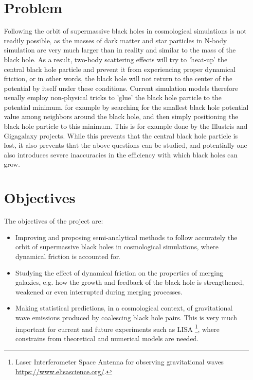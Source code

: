 \documentclass[a4,useAMS,usenatbib,usegraphicx,12pt]{article}
\begin{document}
\section{Problem}


Following the orbit of supermassive black holes in cosmological simulations is 
not readily possible, as the masses of dark matter and star particles in N-body 
simulation are very much larger than in reality and similar to the mass of the 
black hole. As a result, two-body scattering effects will try to 'heat-up' the 
central black hole particle and prevent it from experiencing proper dynamical 
friction, or in other words, the black hole will not return to the center of the 
potential by itself under these conditions. Current simulation models therefore 
usually employ non-physical tricks to 'glue' the black hole particle to the 
potential minimum, for example by searching for the smallest black hole potential 
value among neighbors around the black hole, and then simply positioning the black 
hole particle to this minimum. This is for example done by the Illustris and 
Gigagalaxy projects. While this prevents that the central black hole particle is 
lost, it also prevents that the above questions can be studied, and potentially 
one also introduces severe inaccuracies in the efficiency with which black holes 
can grow.


\section{Objectives}

The objectives of the project are:

\begin{itemize}

\item[\checkmark] Improving and proposing semi-analytical methods to follow 
accurately the orbit of supermassive black holes in cosmological simulations,
where dynamical friction is accounted for.

\item[\checkmark] Studying the effect of dynamical friction on the properties
of merging galaxies, e.g. how the growth and feedback of the black hole is 
strengthened, weakened or even interrupted during merging processes.

\item[\checkmark] Making statistical predictions, in a cosmological context, 
of gravitational wave emissions produced by coalescing black hole pairs.
This is very much important for current and future experiments such as LISA
\footnote{Laser Interferometer Space Antenna for observing gravitational waves
\url{https://www.elisascience.org/}.}, where constrains from theoretical and
numerical models are needed.


\end{itemize}
\end{document}
